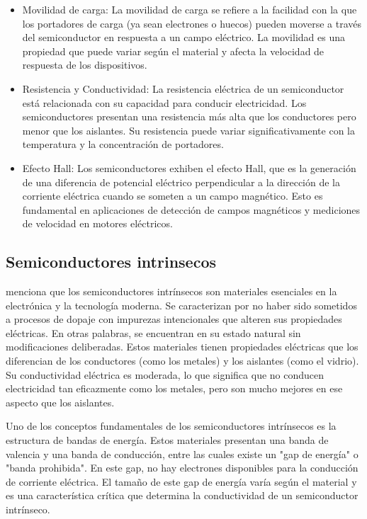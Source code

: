 \documentclass[10.5pt]{article}
\begin{document}
\begin{itemize}
        \item Movilidad de carga: La movilidad de carga se refiere a la facilidad con la que los portadores de carga (ya sean electrones o huecos) pueden moverse a través del semiconductor en respuesta a un campo eléctrico. La movilidad es una propiedad que puede variar según el material y afecta la velocidad de respuesta de los dispositivos.
        \item Resistencia y Conductividad: La resistencia eléctrica de un semiconductor está relacionada con su capacidad para conducir electricidad. Los semiconductores presentan una resistencia más alta que los conductores pero menor que los aislantes. Su resistencia puede variar significativamente con la temperatura y la concentración de portadores.
        \item Efecto Hall: Los semiconductores exhiben el efecto Hall, que es la generación de una diferencia de potencial eléctrico perpendicular a la dirección de la corriente eléctrica cuando se someten a un campo magnético. Esto es fundamental en aplicaciones de detección de campos magnéticos y mediciones de velocidad en motores eléctricos.
    \end{itemize}
    \subsection{Semiconductores intrinsecos}
    \cite{farrera} menciona que los semiconductores intrínsecos son materiales esenciales en la electrónica y la tecnología moderna. Se caracterizan por no haber sido sometidos a procesos de dopaje con impurezas intencionales que alteren sus propiedades eléctricas. En otras palabras, se encuentran en su estado natural sin modificaciones deliberadas. Estos materiales tienen propiedades eléctricas que los diferencian de los conductores (como los metales) y los aislantes (como el vidrio). Su conductividad eléctrica es moderada, lo que significa que no conducen electricidad tan eficazmente como los metales, pero son mucho mejores en ese aspecto que los aislantes.

    Uno de los conceptos fundamentales de los semiconductores intrínsecos es la estructura de bandas de energía. Estos materiales presentan una banda de valencia y una banda de conducción, entre las cuales existe un "gap de energía" o "banda prohibida". En este gap, no hay electrones disponibles para la conducción de corriente eléctrica. El tamaño de este gap de energía varía según el material y es una característica crítica que determina la conductividad de un semiconductor intrínseco.
\end{document}
